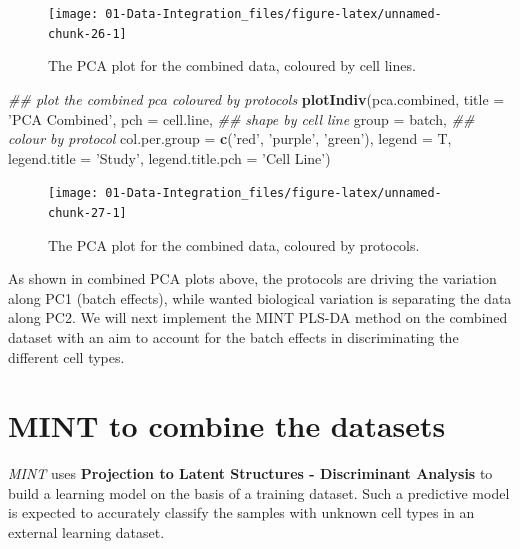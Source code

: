 \documentclass[]{book}
\newenvironment{Shaded}{\begin{snugshade}}{\end{snugshade}}
\newcommand{\CommentTok}[1]{\textcolor[rgb]{0.56,0.35,0.01}{\textit{#1}}}
\newcommand{\DataTypeTok}[1]{\textcolor[rgb]{0.13,0.29,0.53}{#1}}
\newcommand{\KeywordTok}[1]{\textcolor[rgb]{0.13,0.29,0.53}{\textbf{#1}}}
\newcommand{\NormalTok}[1]{#1}
\newcommand{\StringTok}[1]{\textcolor[rgb]{0.31,0.60,0.02}{#1}}
\theoremstyle{definition}
\theoremstyle{definition}
\theoremstyle{definition}
\theoremstyle{remark}
\begin{document}
\begin{figure}[ht]

{\centering \texttt{[image: 01-Data-Integration\_files/figure-latex/unnamed-chunk-26-1]} 

}

\caption{The PCA plot for the combined data, coloured by cell lines.}\label{fig:unnamed-chunk-26}
\end{figure}

\begin{Shaded}
\begin{Highlighting}[]
\CommentTok{## plot the combined pca coloured by protocols}
\KeywordTok{plotIndiv}\NormalTok{(pca.combined, }\DataTypeTok{title =} \StringTok{'PCA Combined'}\NormalTok{,}
          \DataTypeTok{pch =}\NormalTok{ cell.line, }\CommentTok{## shape by cell line}
          \DataTypeTok{group =}\NormalTok{ batch, }\CommentTok{## colour by protocol}
          \DataTypeTok{col.per.group =} \KeywordTok{c}\NormalTok{(}\StringTok{'red'}\NormalTok{, }\StringTok{'purple'}\NormalTok{, }\StringTok{'green'}\NormalTok{),}
          \DataTypeTok{legend =}\NormalTok{ T, }\DataTypeTok{legend.title =} \StringTok{'Study'}\NormalTok{,}
          \DataTypeTok{legend.title.pch =} \StringTok{'Cell Line'}\NormalTok{)}
\end{Highlighting}
\end{Shaded}

\begin{figure}[ht]

{\centering \texttt{[image: 01-Data-Integration\_files/figure-latex/unnamed-chunk-27-1]} 

}

\caption{The PCA plot for the combined data, coloured by protocols.}\label{fig:unnamed-chunk-27}
\end{figure}

As shown in combined PCA plots above, the protocols are driving the
variation along PC1 (batch effects), while wanted biological variation
is separating the data along PC2. We will next implement the MINT PLS-DA
method on the combined dataset with an aim to account for the batch
effects in discriminating the different cell types.

\hypertarget{mint-to-combine-the-datasets}{%
\section{MINT to combine the
datasets}\label{mint-to-combine-the-datasets}}

\emph{MINT} uses \textbf{Projection to Latent Structures - Discriminant
Analysis} to build a learning model on the basis of a training dataset.
Such a predictive model is expected to accurately classify the samples
with unknown cell types in an external learning dataset.
\end{document}
